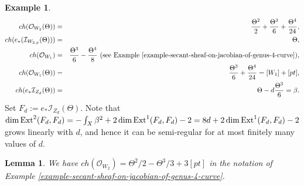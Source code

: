 \documentclass[12pt]{amsart}
\numberwithin{equation}{subsection}
\theoremstyle{plain}
\newtheorem{lem}[thm]{Lemma}
\theoremstyle{definition}
\newtheorem{example}[thm]{Example}
\newcommand{\StructureSheaf}[1]{{\mathcal O}_{#1}}
\newcommand{\Ext}{{\rm Ext}}
\newcommand{\Ideal}[1]{{\mathcal I}_{#1}}
\begin{document}
\begin{example}
\begin{eqnarray*}
ch(\StructureSheaf{W_2}(\Theta))&=& \frac{\Theta^2}{2}+\frac{\Theta^3}{6}+\frac{\Theta^4}{24},
\\
ch(e_*(\Ideal{W_{2,p}}(\Theta)))&=&\Theta,
\\
ch(\StructureSheaf{W_1})&=&\frac{\Theta^3}{6}-\frac{\Theta^4}{8}  \ \mbox{(see Example \ref{example-secant-sheaf-on-jacobian-of-genus-4-curve})},
\\
ch(\StructureSheaf{W_1}(\Theta))&=&\frac{\Theta^3}{6}+\frac{\Theta^4}{24}=[W_1]+[pt],
\\
ch(e_*\Ideal{Z_d}(\Theta))&=& \Theta-d\frac{\Theta^3}{6}=\beta.
\end{eqnarray*}
Set $F_d:=e_*\Ideal{Z_d}(\Theta)$.
Note that $\dim\Ext^2(F_d,F_d)=-\int_X\beta^2+2\dim\Ext^1(F_d,F_d)-2=8d+2\dim\Ext^1(F_d,F_d)-2$ grows linearly with $d$, and hence it can be semi-regular for at most finitely many values of $d$.
\end{example}



\begin{lem}
\label{lemma-ch-O-W-2}
We have 
$ch(\StructureSheaf{W_2})=\Theta^2/2 -\Theta^3/3+3[pt]$ in  the notation of Example \ref{example-secant-sheaf-on-jacobian-of-genus-4-curve}. 
\end{lem}
\end{document}

